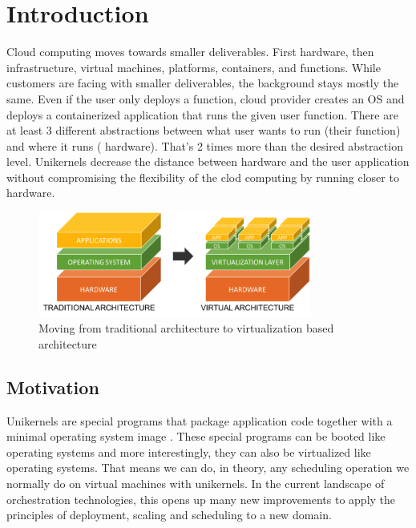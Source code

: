 
\chapter{Introduction}\label{chapter:introduction}
Cloud computing moves towards smaller deliverables. First hardware, then infrastructure, virtual machines, platforms, containers, and functions. While customers are facing with smaller deliverables, the background stays mostly the same. Even if the user only deploys a function, cloud provider creates an OS and deploys a containerized application that runs the given user function. There are at least 3 different abstractions between what user wants to run (their function) and where it runs ( hardware). That's 2 times more than the desired abstraction level. Unikernels decrease the distance between hardware and the user application without compromising the flexibility of the clod computing by running closer to hardware.

\begin{figure}[htpb]
  \centering
  \includegraphics[width=0.8\textwidth]{figures/1-123.png}
  \caption{Moving from traditional architecture to virtualization based architecture \cite{arch-photo} } \label{fig:arch}
\end{figure}
\section{Motivation}
Unikernels are special programs that package application code together with a minimal operating system image \cite{7396164}. These special programs can be booted like operating systems and more interestingly, they can also be virtualized like operating systems. That means we can do, in theory, any scheduling operation we normally do on virtual machines with unikernels. In the current landscape of orchestration technologies, this opens up many new improvements to apply the principles of deployment, scaling and scheduling to a new domain.

